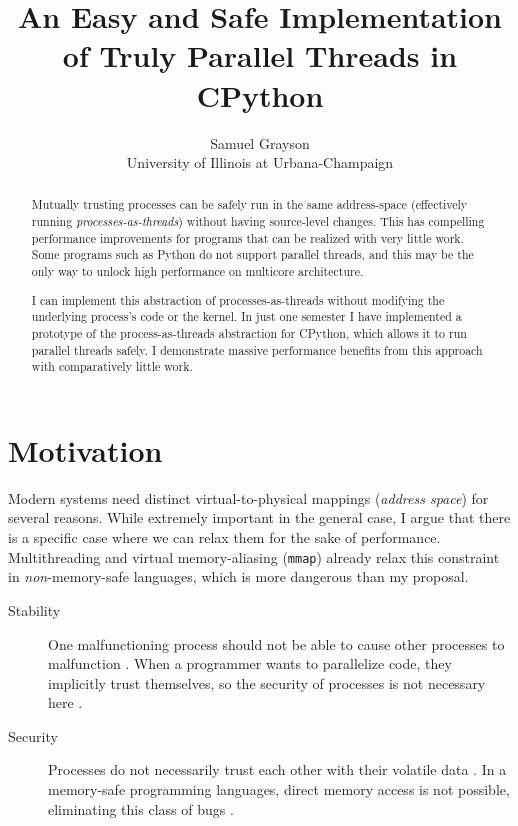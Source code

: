 \documentclass[letterpaper,twocolumn,10pt]{article}
\begin{document}

\title{\Large \bf An Easy and Safe Implementation of Truly Parallel Threads in CPython}

\author{
{\rm Samuel Grayson}\\
University of Illinois at Urbana-Champaign
}

\newcommand{\citeme}{ }

\begin{abstract}

  Mutually trusting processes can be safely run in the same address-space (effectively running \textit{processes-as-threads}) without having source-level changes.
  This has compelling performance improvements for programs that can be realized with very little work.
  Some programs such as Python do not support parallel threads, and this may be the only way to unlock high performance on multicore architecture.

  I can implement this abstraction of processes-as-threads without modifying the underlying process's code or the kernel.
  In just one semester I have implemented a prototype of the process-as-threads abstraction for CPython, which allows it to run parallel threads safely.
  I demonstrate massive performance benefits from this approach with comparatively little work.
\end{abstract}

\section{Motivation}

Modern systems need distinct virtual-to-physical mappings (\textit{address space}) for several reasons. While extremely important in the general case, 
I argue that there is a specific case where we can relax them for the sake of performance. Multithreading and virtual memory-aliasing (\texttt{mmap}) already relax this constraint in \textit{non}-memory-safe languages, which is more dangerous than my proposal.

\begin{description}
\item[Stability]
  One malfunctioning process should not be able to cause other processes to malfunction\citeme.
  When a programmer wants to parallelize code, they implicitly trust themselves, so the security of processes is not necessary here\citeme.
\item[Security]
  Processes do not necessarily trust each other with their volatile data\citeme.
  In a memory-safe programming languages, direct memory access is not possible, eliminating this class of bugs\citeme.
\end{description}
\end{document}
